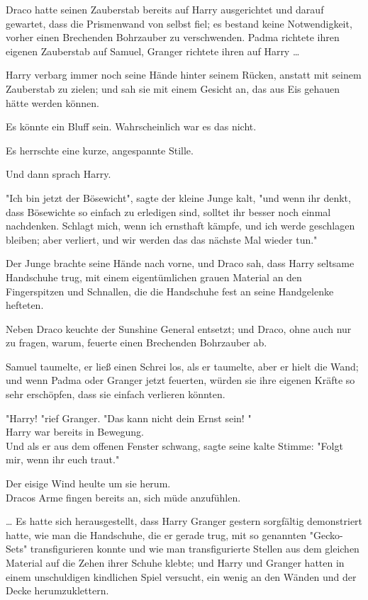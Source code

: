 {Draco hatte seinen Zauberstab bereits auf Harry ausgerichtet und darauf gewartet, dass die Prismenwand von selbst fiel; es bestand keine Notwendigkeit, vorher einen Brechenden Bohrzauber zu verschwenden. Padma richtete ihren eigenen Zauberstab auf Samuel, Granger richtete ihren auf Harry …

Harry verbarg immer noch seine Hände hinter seinem Rücken, anstatt mit seinem Zauberstab zu zielen; und sah sie mit einem Gesicht an, das aus Eis gehauen hätte werden können.

Es könnte ein Bluff sein. Wahrscheinlich war es das nicht.

Es herrschte eine kurze, angespannte Stille.

Und dann sprach Harry.

"Ich bin jetzt der Bösewicht", sagte der kleine Junge kalt, "und wenn ihr denkt, dass Bösewichte so einfach zu erledigen sind, solltet ihr besser noch einmal nachdenken. Schlagt mich, wenn ich ernsthaft kämpfe, und ich werde geschlagen bleiben; aber verliert, und wir werden das das nächste Mal wieder tun."

Der Junge brachte seine Hände nach vorne, und Draco sah, dass Harry seltsame Handschuhe trug, mit einem eigentümlichen grauen Material an den Fingerspitzen und Schnallen, die die Handschuhe fest an seine Handgelenke hefteten.

Neben Draco keuchte der Sunshine General entsetzt; und Draco, ohne auch nur zu fragen, warum, feuerte einen Brechenden Bohrzauber ab.

Samuel taumelte, er ließ einen Schrei los, als er taumelte, aber er hielt die Wand; und wenn Padma oder Granger jetzt feuerten, würden sie ihre eigenen Kräfte so sehr erschöpfen, dass sie einfach verlieren könnten.

"Harry! "rief Granger. "Das kann nicht dein Ernst sein! "\\ Harry war bereits in Bewegung.\\ Und als er aus dem offenen Fenster schwang, sagte seine kalte Stimme: "Folgt mir, wenn ihr euch traut."

Der eisige Wind heulte um sie herum.\\ Dracos Arme fingen bereits an, sich müde anzufühlen.

… Es hatte sich herausgestellt, dass Harry Granger gestern sorgfältig demonstriert hatte, wie man die Handschuhe, die er gerade trug, mit so genannten "Gecko-Sets" transfigurieren konnte und wie man transfigurierte Stellen aus dem gleichen Material auf die Zehen ihrer Schuhe klebte; und Harry und Granger hatten in einem unschuldigen kindlichen Spiel versucht, ein wenig an den Wänden und der Decke herumzuklettern.

}

